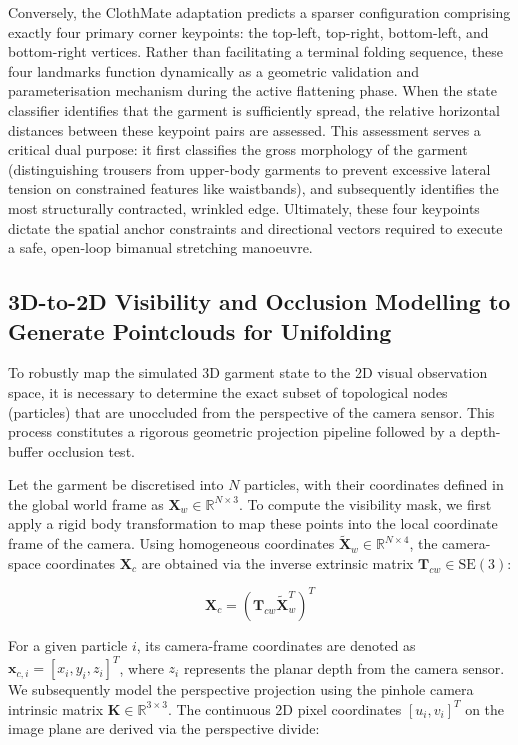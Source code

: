 \documentclass[journal]{IEEEtran}
\begin{document}
Conversely, the ClothMate adaptation predicts a sparser configuration comprising exactly four primary corner keypoints: the top-left, top-right, bottom-left, and bottom-right vertices. Rather than facilitating a terminal folding sequence, these four landmarks function dynamically as a geometric validation and parameterisation mechanism during the active flattening phase. When the state classifier identifies that the garment is sufficiently spread, the relative horizontal distances between these keypoint pairs are assessed. This assessment serves a critical dual purpose: it first classifies the gross morphology of the garment (distinguishing trousers from upper-body garments to prevent excessive lateral tension on constrained features like waistbands), and subsequently identifies the most structurally contracted, wrinkled edge. Ultimately, these four keypoints dictate the spatial anchor constraints and directional vectors required to execute a safe, open-loop bimanual stretching manoeuvre.

\subsection{3D-to-2D Visibility and Occlusion Modelling to Generate Pointclouds for Unifolding}

To robustly map the simulated 3D garment state to the 2D visual observation space, it is necessary to determine the exact subset of topological nodes (particles) that are unoccluded from the perspective of the camera sensor. This process constitutes a rigorous geometric projection pipeline followed by a depth-buffer occlusion test.

Let the garment be discretised into $N$ particles, with their coordinates defined in the global world frame as $\mathbf{X}_w \in \mathbb{R}^{N \times 3}$. To compute the visibility mask, we first apply a rigid body transformation to map these points into the local coordinate frame of the camera. Using homogeneous coordinates $\tilde{\mathbf{X}}_w \in \mathbb{R}^{N \times 4}$, the camera-space coordinates $\mathbf{X}_c$ are obtained via the inverse extrinsic matrix $\mathbf{T}_{cw} \in \text{SE}(3)$:

\begin{equation}
    \mathbf{X}_c = (\mathbf{T}_{cw} \tilde{\mathbf{X}}_w^T)^T
\end{equation}

For a given particle $i$, its camera-frame coordinates are denoted as $\mathbf{x}_{c,i} = [x_i, y_i, z_i]^T$, where $z_i$ represents the planar depth from the camera sensor. We subsequently model the perspective projection using the pinhole camera intrinsic matrix $\mathbf{K} \in \mathbb{R}^{3 \times 3}$. The continuous 2D pixel coordinates $[u_i, v_i]^T$ on the image plane are derived via the perspective divide:
\end{document}
